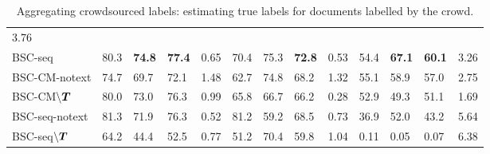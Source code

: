 \begin{table}
\begin{tabular}{l l l l r@{\hskip 0.8cm} l l l r@{\hskip 0.8cm} l l l r }
3.76 
\\ 
BSC-seq & 
80.3 & \textbf{74.8} & \textbf{77.4} & 0.65 & 
70.4 & 75.3 & \textbf{72.8} & 0.53 & 
54.4 & \textbf{67.1} & \textbf{60.1} & %
 3.26
\\ \midrule
BSC-CM-notext & 
74.7 & 69.7 & 72.1 & 1.48 & 
62.7 & 74.8 & 68.2 & 1.32 & 
55.1 & 58.9 & 57.0 & 2.75
\\
BSC-CM$\backslash\boldsymbol T$ & 
80.0 & 73.0 & 76.3 & 0.99 &
65.8 & 66.7 & 66.2 & 0.28 &
52.9 & 49.3 & 51.1 & 1.69
 \\
BSC-seq-notext & 
81.3 & 71.9 & 76.3 & 0.52 & 
81.2 & 59.2 & 68.5 & 0.73 &
36.9 & 52.0 & 43.2 & 5.64 
\\ 
BSC-seq$\backslash\boldsymbol T$ & 
64.2 & 44.4 & 52.5 & 0.77 &
51.2 & 70.4 & 59.8 & 1.04 &
0.11 & 0.05 & 0.07 & 6.38
\\
\bottomrule 
\end{tabular}
\caption{Aggregating crowdsourced labels: estimating true labels for documents labelled by the crowd.}
\label{tab:aggregation_results}
\npnoround
\end{table}

